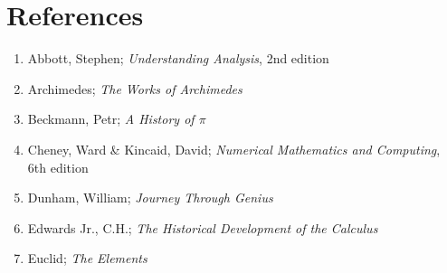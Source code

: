 \documentclass[letterpaper, 12pt]{amsart}
\theoremstyle{definition}  %
\begin{document}
	\appendix

	\section{References}
	\label{sec:references}
	\begin{enumerate}
		\item Abbott, Stephen; \textit{Understanding Analysis}, 2nd edition
		\item Archimedes; \textit{The Works of Archimedes}
		\item Beckmann, Petr; \textit{A History of $\pi$}
		\item Cheney, Ward \& Kincaid, David; \textit{Numerical Mathematics and Computing}, 6th edition
		\item Dunham, William; \textit{Journey Through Genius}
		\item Edwards Jr., C.H.; \textit{The Historical Development of the Calculus}
		\item Euclid; \textit{The Elements}
	\end{enumerate}
\end{document}
